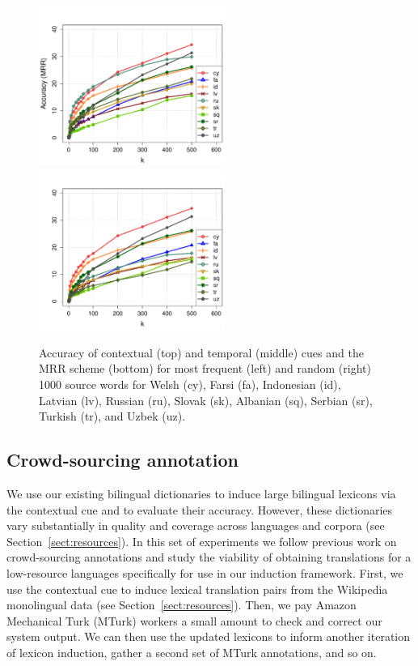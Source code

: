 \documentclass{article}
\newcommand{\secref}[1]{Section~\ref{#1}}
\begin{document}
\begin{figure}[h!]
\centerline{\mbox{\includegraphics[width=2.4in]{figures/exp3/freq/freqmrr} \includegraphics[width=2.4in]{figures/exp3/rand/randmrr}}}
\caption{Accuracy of contextual (top) and temporal (middle) cues and the MRR scheme (bottom) for most frequent (left) and random (right) 1000 source words for Welsh (cy), Farsi (fa), Indonesian (id), Latvian (lv), Russian (ru), Slovak (sk), Albanian (sq), Serbian (sr), Turkish (tr), and Uzbek (uz).}
\label{fig:exp3}
\end{figure}

\subsection{Crowd-sourcing annotation} \label{sect:mturk}

We use our existing bilingual dictionaries to induce large bilingual lexicons via the contextual cue and to evaluate their accuracy.  However, these dictionaries vary substantially in quality and coverage across languages and corpora (see \secref{sect:resources}).  In this set of experiments we follow previous work on crowd-sourcing annotations \cite{Snow:2008,CCB:2009} and study \cite{Irvine:2010} the viability of obtaining translations for a low-resource languages specifically for use in our induction framework.  First, we use the contextual cue to induce lexical translation pairs from the Wikipedia monolingual data (see \secref{sect:resources}). Then, we pay Amazon Mechanical Turk (MTurk) workers a small amount to check and correct our system output. We can then use the updated lexicons to inform another iteration of lexicon induction, gather a second set of MTurk annotations, and so on. \\
\end{document}
